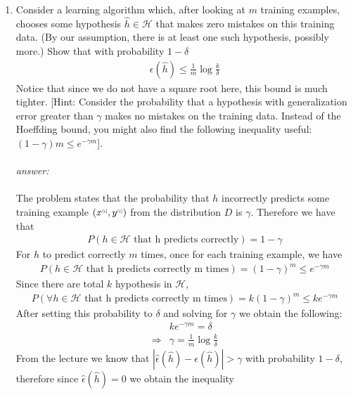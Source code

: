\documentclass{article}
\newcommand{\supi}[1]{\scalebox{0.6}[0.75]{$^{(#1)}$}}\newcommand{\supi}{\scalebox{0.6}[0.75]{$^{(i)}$}}
\begin{document}
\begin{enumerate}[label=(\alph*)]
    \item Consider a learning algorithm which, after looking at $m$ training examples, chooses some hypothesis $\hat{h}\in \mathcal{H}$ that makes zero mistakes on this training data. (By our assumption, there is at least one such hypothesis, possibly more.) Show that with probability $1-\delta$\begin{align*}
        \epsilon(\hat{h})\leq \frac{1}{m}\log\frac{k}{\delta}
    \end{align*}
    Notice that since we do not have a square root here, this bound is much tighter. [Hint: Consider the probability that a hypothesis with generalization error greater than $\gamma$ makes no mistakes on the training data. Instead of the Hoeffding bound, you might also find the following inequality useful: $(1-\gamma)m\leq e^{-\gamma m}$].\\\\
    \textit{answer:}\\\\
The problem states that the probability that $h$ incorrectly predicts some training example $(x\supi{i}, y\supi{i})$ from the distribution $D$ is $\gamma$. Therefore we have that \begin{align*}
    P(h\in \mathcal{H} \text{ that h predicts correctly})=1-\gamma
\end{align*}
For $h$ to predict correctly $m$ times, once for each training example, we have \begin{align*}
    P( h\in \mathcal{H} \text{ that h predicts correctly m times})=(1-\gamma)^m \leq e^{-\gamma m}
\end{align*}
Since there are total $k$ hypothesis in $\mathcal{H}$, \begin{align*}
    P(\forall h\in \mathcal{H} \text{ that h predicts correctly m times})=k(1-\gamma)^m \leq ke^{-\gamma m}
\end{align*}
After setting this probability to $\delta$ and solving for $\gamma$ we obtain the following:\begin{align*}
    &ke^{-\gamma m} = \delta\\
    \Longrightarrow &\gamma = \frac{1}{m}\log\frac{k}{\delta}
\end{align*}
From the lecture we know that $|\hat{\epsilon}(\hat{h})-\epsilon(\hat{h})|> \gamma$ with probability $1-\delta$, therefore since $\hat{\epsilon}{(\hat{h})}= 0$ we obtain the inequality \begin{align*}

\end{align*}
\end{enumerate}
\end{document}
